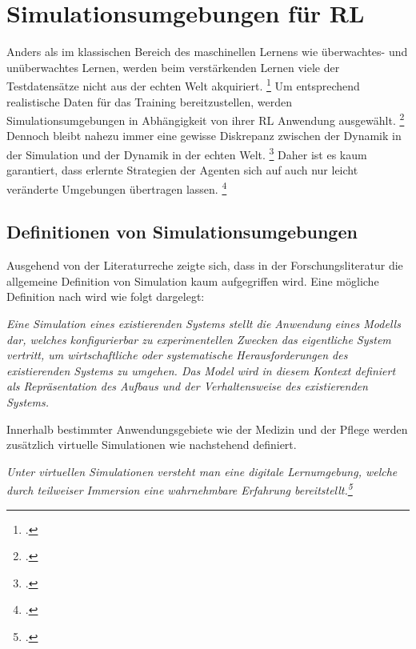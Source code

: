 \section{Simulationsumgebungen für RL}

Anders als im klassischen Bereich des maschinellen Lernens wie überwachtes- und unüberwachtes Lernen, werden beim verstärkenden Lernen viele der Testdatensätze nicht aus der echten Welt akquiriert. \footcite[Vgl.][S. 1]{Zhang.2018}
Um entsprechend realistische Daten für das Training bereitzustellen, werden Simulationsumgebungen in Abhängigkeit von ihrer RL Anwendung ausgewählt. \footcite[Vgl.][S. 7]{Korber.2021}
Dennoch bleibt nahezu immer eine gewisse Diskrepanz zwischen der Dynamik in der Simulation und der Dynamik in der echten Welt. \footcite[Vgl.][S. 1]{Bharadhwaj.2019}
Daher ist es kaum garantiert, dass erlernte Strategien der Agenten sich auf auch nur leicht veränderte Umgebungen übertragen lassen. \footcite[Vgl.][S. 1]{Bharadhwaj.2019}

\subsection{Definitionen von Simulationsumgebungen}
Ausgehend von der Literaturreche zeigte sich, dass in der Forschungsliteratur die allgemeine Definition von Simulation kaum aufgegriffen wird.
Eine mögliche Definition nach \cite[]{Maria.1997} wird wie folgt dargelegt:

\textit{Eine Simulation eines existierenden Systems stellt die Anwendung eines Modells dar, welches konfigurierbar zu experimentellen Zwecken das eigentliche System vertritt, um wirtschaftliche oder systematische Herausforderungen des existierenden Systems zu umgehen.
Das Model wird in diesem Kontext definiert als Repräsentation des Aufbaus und der Verhaltensweise des existierenden Systems.}

Innerhalb bestimmter Anwendungsgebiete wie der Medizin und der Pflege werden zusätzlich virtuelle Simulationen wie nachstehend definiert.

\textit{Unter virtuellen Simulationen versteht man eine digitale Lernumgebung, welche durch teilweiser Immersion eine wahrnehmbare Erfahrung bereitstellt.\footcite[Vgl.][S. 1]{Foronda.2021}}

